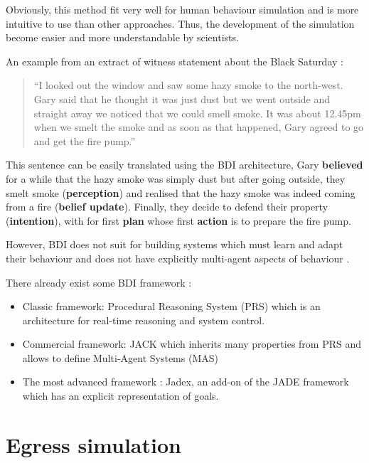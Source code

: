 \documentclass[12pt, a4paper]{memoir} %
\begin{document}
			Obviously, this method fit very well for human behaviour simulation and is more intuitive to use than other approaches.
			Thus, the development of the simulation become easier and more understandable by scientists.

			An example from an extract of witness statement about the Black Saturday :
			\begin{quote}
				\textquotedblleft I looked out the window and saw some hazy smoke to the north-west. Gary said that he thought it was just dust but we went outside and straight away we noticed that we could smell smoke. It was about 12.45pm when we smelt the smoke and as soon as that happened, Gary agreed to go and get the fire pump.\textquotedblright \cite{exell}
			\end{quote}
			This sentence can be easily translated using the BDI architecture, Gary \textbf{believed} for a while that the hazy smoke
			was simply dust but after going outside, they smelt smoke (\textbf{perception}) and realised that the hazy smoke
			was indeed coming from a fire (\textbf{belief update}). Finally, they decide to defend their property (\textbf{intention}),
			with for first \textbf{plan} whose first \textbf{action} is to prepare the fire pump.

			However, BDI does not suit for building systems which must learn and adapt their behaviour and does not have explicitly
			multi-agent aspects of behaviour \cite{georgeff1999}.

			There already exist some BDI framework \cite{caillou2015}:
			\begin{itemize}
				\item Classic framework: Procedural Reasoning System (PRS) which is an architecture for real-time reasoning and system control\cite{ingrand1992}.
				\item Commercial framework: JACK which inherits many properties from PRS and allows to define Multi-Agent Systems (MAS)
				\item The most advanced framework : Jadex, an add-on of the JADE framework which has an explicit representation of goals.
			\end{itemize}

	\section{Egress simulation}
\end{document}
